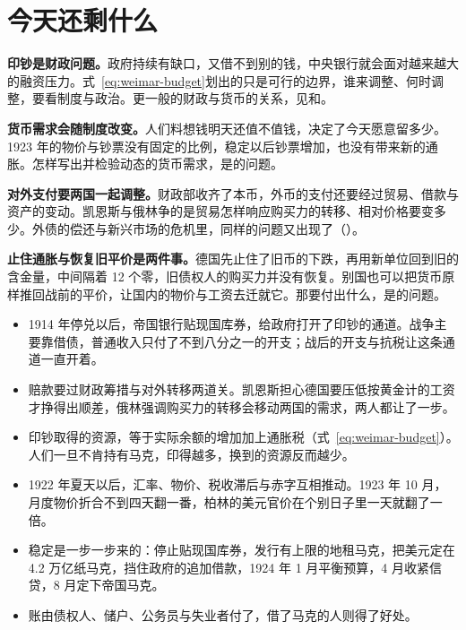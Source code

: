 \section{今天还剩什么}\label{sec:weimar-legacy}

\textbf{印钞是财政问题。}政府持续有缺口，又借不到别的钱，中央银行就会面对越来越大的融资压力。式~\eqref{eq:weimar-budget}划出的只是可行的边界，谁来调整、何时调整，要看制度与政治。更一般的财政与货币的关系，见和。

\textbf{货币需求会随制度改变。}人们料想钱明天还值不值钱，决定了今天愿意留多少。1923 年的物价与钞票没有固定的比例，稳定以后钞票增加，也没有带来新的通胀。怎样写出并检验动态的货币需求，是的问题。

\textbf{对外支付要两国一起调整。}财政部收齐了本币，外币的支付还要经过贸易、借款与资产的变动。凯恩斯与俄林争的是贸易怎样响应购买力的转移、相对价格要变多少。外债的偿还与新兴市场的危机里，同样的问题又出现了（）。

\textbf{止住通胀与恢复旧平价是两件事。}德国先止住了旧币的下跌，再用新单位回到旧的含金量，中间隔着 12 个零，旧债权人的购买力并没有恢复。别国也可以把货币原样推回战前的平价，让国内的物价与工资去迁就它。那要付出什么，是的问题。

\begin{takeaways}
\begin{itemize}
\item 1914 年停兑以后，帝国银行贴现国库券，给政府打开了印钞的通道。战争主要靠借债，普通收入只付了不到八分之一的开支；战后的开支与抗税让这条通道一直开着。
\item 赔款要过财政筹措与对外转移两道关。凯恩斯担心德国要压低按黄金计的工资才挣得出顺差，俄林强调购买力的转移会移动两国的需求，两人都让了一步。
\item 印钞取得的资源，等于实际余额的增加加上通胀税（式~\eqref{eq:weimar-budget}）。人们一旦不肯持有马克，印得越多，换到的资源反而越少。
\item 1922 年夏天以后，汇率、物价、税收滞后与赤字互相推动。1923 年 10 月，月度物价折合不到四天翻一番，柏林的美元官价在个别日子里一天就翻了一倍。
\item 稳定是一步一步来的：停止贴现国库券，发行有上限的地租马克，把美元定在 4.2 万亿纸马克，挡住政府的追加借款，1924 年 1 月平衡预算，4 月收紧信贷，8 月定下帝国马克。
\item 账由债权人、储户、公务员与失业者付了，借了马克的人则得了好处。
\end{itemize}
\end{takeaways}

